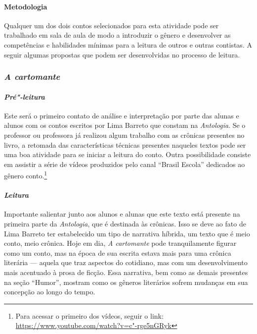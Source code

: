 \documentclass{extarticle}
\begin{document}
\paragraph{Metodologia} Qualquer um dos dois contos selecionados para esta
atividade pode ser trabalhado em sala de aula de modo a introduzir o
gênero e desenvolver as competências e habilidades mínimas para a
leitura de outros e outras contistas. A seguir algumas propostas que
podem ser desenvolvidas no processo de leitura.


\subsubsection{\textit{A cartomante}}

\paragraph{\textit{Pré"-leitura}}

Este será o primeiro contato de análise e interpretação por parte das
alunas e alunos com os contos escritos por Lima Barreto que constam na
\emph{Antologia}. Se o professor ou professora já realizou algum
trabalho com as crônicas presentes no livro, a retomada das
características técnicas presentes naqueles textos pode ser uma boa
atividade para se iniciar a leitura do conto. Outra possibilidade
consiste em assistir a série de vídeos produzidos pelo canal ``Brasil
Escola'' dedicados ao gênero conto.\footnote{Para acessar o primeiro dos
  vídeos, seguir o link:
  \url{https://www.youtube.com/watch?v=c"-rge5nGRyk}}

\paragraph{\textit{Leitura}}

Importante salientar junto aos alunos e alunas que este texto está
presente na primeira parte da \emph{Antologia}, que é destinada às
crônicas. Isso se deve ao fato de Lima Barreto ter estabelecido um tipo
de narrativa híbrida, um texto que é meio conto, meio crônica. Hoje em
dia, \textit{\emph{A cartomante}} pode tranquilamente figurar como um
conto, mas na época de sua escrita estava mais para uma crônica
literária --- aquela que traz aspectos do cotidiano, mas com um
desenvolvimento mais acentuado à prosa de ficção. Essa narrativa, bem
como as demais presentes na seção ``Humor'', mostram como os gêneros
literários sofrem mudanças em sua concepção ao longo do tempo.
\end{document}

